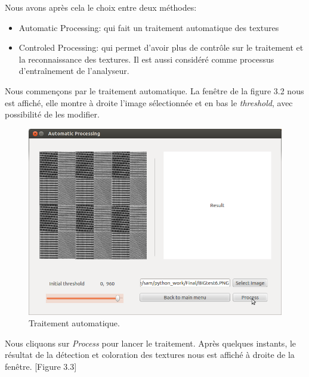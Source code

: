 \indent Nous avons après cela le choix entre deux méthodes: 
\begin{itemize}


\item Automatic Processing: qui fait un traitement automatique des textures \\
\item Controled Processing: qui permet d'avoir plus de contrôle sur le traitement et la reconnaissance des textures. Il est aussi considéré comme processus d’entraînement de l'analyseur.\\
\end{itemize}
\indent Nous commençons par le traitement automatique. La fenêtre de la figure 3.2 nous est affiché, elle montre à droite l'image sélectionnée et en bas le \textit{threshold}, avec possibilité de les modifier.

\begin{figure}[H]
	\centering
		\includegraphics[width=12cm,]{Figures/chap3/4.png}
	\caption[traitementAuto]{Traitement automatique.}
	\label{fig:traitementAuto}
\end{figure}

\indent Nous cliquons sur \textit{Process} pour lancer le traitement.
Après quelques instants, le résultat de la détection et coloration des textures nous est affiché à droite de la fenêtre. [Figure 3.3]

